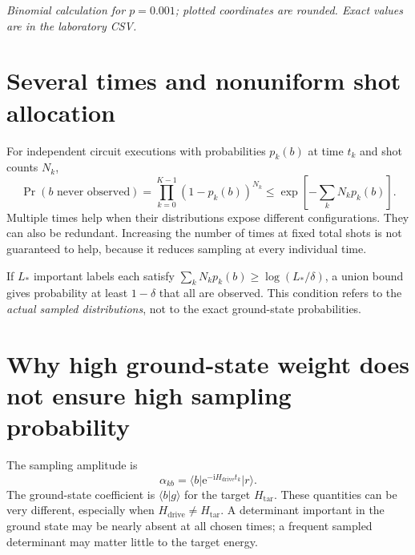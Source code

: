 \documentclass[11pt,a4paper,oneside]{report}
\newcommand{\ket}[1]{\lvert #1\rangle}
\newcommand{\bra}[1]{\langle #1\rvert}
\newcommand{\braket}[2]{\langle #1\vert #2\rangle}
\newcommand{\Ht}{H_{\mathrm{tar}}}
\newcommand{\Hd}{H_{\mathrm{drive}}}
\newcommand{\I}{\mathrm i}
\newcommand{\e}{\mathrm e}
\begin{document}
\begin{center}
\end{center}
\textit{Binomial calculation for $p=0.001$; plotted coordinates are rounded. Exact values are in the laboratory CSV.}

\section{Several times and nonuniform shot allocation}
For independent circuit executions with probabilities $p_k(b)$ at time $t_k$ and shot counts $N_k$,
\begin{equation}\label{eq:miss}
\Pr(b\text{ never observed})=\prod_{k=0}^{K-1}(1-p_k(b))^{N_k}
\le\exp\left[-\sum_kN_kp_k(b)\right].
\end{equation}
Multiple times help when their distributions expose different configurations. They can also be redundant. Increasing the number of times at fixed total shots is not guaranteed to help, because it reduces sampling at every individual time.

If $L_*$ important labels each satisfy $\sum_kN_kp_k(b)\ge\log(L_*/\delta)$, a union bound gives probability at least $1-\delta$ that all are observed. This condition refers to the \emph{actual sampled distributions}, not to the exact ground-state probabilities.

\section{Why high ground-state weight does not ensure high sampling probability}
The sampling amplitude is
\begin{equation}
\alpha_{kb}=\bra b\e^{-\I\Hd t_k}\ket r.
\end{equation}
The ground-state coefficient is $\braket b g$ for the target $\Ht$. These quantities can be very different, especially when $\Hd\ne\Ht$. A determinant important in the ground state may be nearly absent at all chosen times; a frequent sampled determinant may matter little to the target energy.
\end{document}
